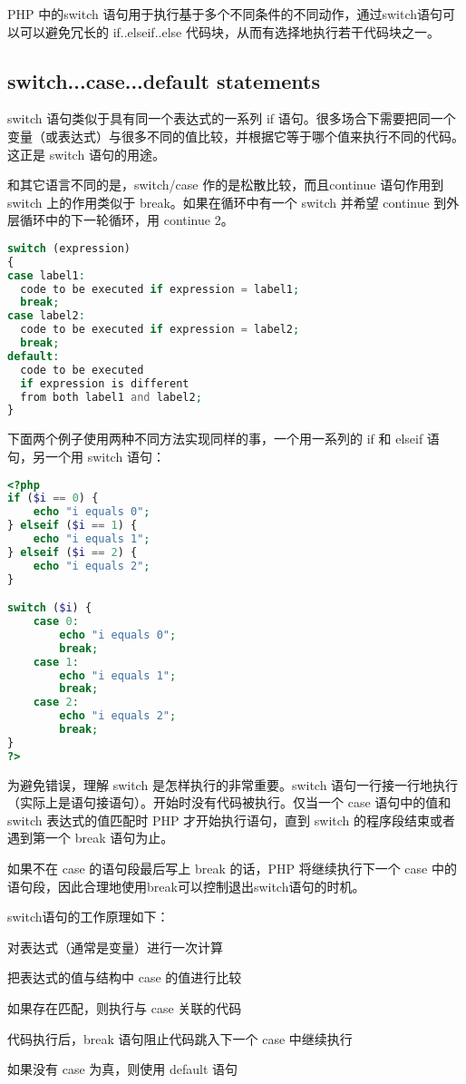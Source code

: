 PHP 中的switch 语句用于执行基于多个不同条件的不同动作，通过switch语句可以可以避免冗长的 if..elseif..else 代码块，从而有选择地执行若干代码块之一。


\subsection{switch...case...default statements}

switch 语句类似于具有同一个表达式的一系列 if 语句。很多场合下需要把同一个变量（或表达式）与很多不同的值比较，并根据它等于哪个值来执行不同的代码。这正是 switch 语句的用途。

和其它语言不同的是，switch/case 作的是松散比较，而且continue 语句作用到 switch 上的作用类似于 break。如果在循环中有一个 switch 并希望 continue 到外层循环中的下一轮循环，用 continue 2。

\begin{lstlisting}[language=PHP]
switch (expression)
{
case label1:
  code to be executed if expression = label1;
  break;  
case label2:
  code to be executed if expression = label2;
  break;
default:
  code to be executed
  if expression is different 
  from both label1 and label2;
}
\end{lstlisting}

下面两个例子使用两种不同方法实现同样的事，一个用一系列的 if 和 elseif 语句，另一个用 switch 语句：

\begin{lstlisting}[language=PHP]
<?php
if ($i == 0) {
    echo "i equals 0";
} elseif ($i == 1) {
    echo "i equals 1";
} elseif ($i == 2) {
    echo "i equals 2";
}

switch ($i) {
    case 0:
        echo "i equals 0";
        break;
    case 1:
        echo "i equals 1";
        break;
    case 2:
        echo "i equals 2";
        break;
}
?>
\end{lstlisting}

为避免错误，理解 switch 是怎样执行的非常重要。switch 语句一行接一行地执行（实际上是语句接语句）。开始时没有代码被执行。仅当一个 case 语句中的值和 switch 表达式的值匹配时 PHP 才开始执行语句，直到 switch 的程序段结束或者遇到第一个 break 语句为止。

如果不在 case 的语句段最后写上 break 的话，PHP 将继续执行下一个 case 中的语句段，因此合理地使用break可以控制退出switch语句的时机。


switch语句的工作原理如下：

\begin{compactenum}
\item 对表达式（通常是变量）进行一次计算
\item 把表达式的值与结构中 case 的值进行比较
\item 如果存在匹配，则执行与 case 关联的代码
\item 代码执行后，break 语句阻止代码跳入下一个 case 中继续执行
\item 如果没有 case 为真，则使用 default 语句
\end{compactenum}




